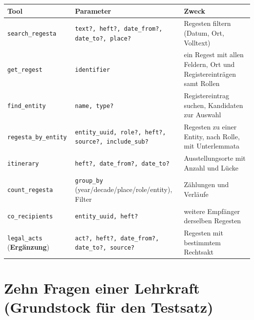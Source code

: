 \documentclass[10pt,a4paper]{article}
\newcommand{\code}[1]{\texttt{\small #1}}
\newcommand{\erg}{\textbf{Ergänzung}}
\begin{document}
\begin{small}
\begin{tabularx}{\textwidth}{@{}lp{6.3cm}L@{}}
\toprule
\textbf{Tool} & \textbf{Parameter} & \textbf{Zweck}\\\midrule
\code{search\_regesta} & \code{text?, heft?, date\_from?, date\_to?, place?} & Regesten filtern (Datum, Ort, Volltext)\\
\code{get\_regest} & \code{identifier} & ein Regest mit allen Feldern, Ort und Registereinträgen samt Rollen\\
\code{find\_entity} & \code{name, type?} & Registereintrag suchen, Kandidaten zur Auswahl\\
\code{regesta\_by\_entity} & \code{entity\_uuid, role?, heft?, source?, include\_sub?} & Regesten zu einer Entity, nach Rolle, mit Unterlemmata\\
\code{itinerary} & \code{heft?, date\_from?, date\_to?} & Ausstellungsorte mit Anzahl und Lücke\\
\code{count\_regesta} & \code{group\_by} (year/decade/place/role/entity), Filter & Zählungen und Verläufe\\
\code{co\_recipients} & \code{entity\_uuid, heft?} & weitere Empfänger derselben Regesten\\
\code{legal\_acts} (\erg) & \code{act?, heft?, date\_from?, date\_to?, source?} & Regesten mit bestimmtem Rechtsakt\\
\bottomrule
\end{tabularx}
\end{small}

\section{Zehn Fragen einer Lehrkraft (Grundstock für den Testsatz)}
\end{document}
